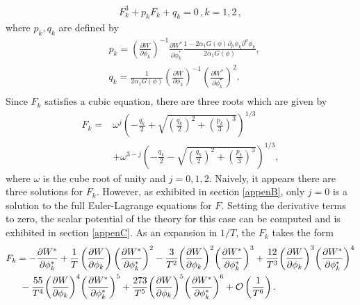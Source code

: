\documentclass[a4paper,11pt]{article}
\begin{document}
  \begin{align}
    F_k^3+ p_k F_k + q_k=0\,, k=1,2\,,
  \end{align}
  where $p_k, q_k$ are defined by
  \begin{equation}\label{DisplayFormulaNumbered:eq.twoDBI.p.1}
  \begin{split}
    & p_k={\left(\frac{\partial W}{\partial \phi_k}\right)}^{-1}\frac{\partial W^*}{\partial \phi^*_k}\frac{1-2\alpha_1 G\left(\phi\right)\partial_\mu \phi_k\partial^\mu \phi_k}{2\alpha_1 G\left(\phi\right)}, \\
    & q_k=\frac{1}{2\alpha_1 G\left(\phi\right)}{\left(\frac{\partial W}{\partial \phi_k}\right)}^{-1}{\left(\frac{\partial W^*}{\partial \phi^*_k}\right)}^2. \\
  \end{split}
  \end{equation}
  Since $F_k$ satisfies a cubic equation, there are three roots which are given by
  \begin{equation}
  \begin{split}
    F_k=& \omega^j {\left(-\frac{q_k}{2}+\sqrt{ {\left(\frac{q_k}{2}\right)}^2+{\left(\frac{p_k}{3}\right)}^3}\right)}^{1/3}\\
    &+ \omega^{3-j}{\left(-\frac{q_k}{2}-\sqrt{ {\left(\frac{q_k}{2}\right)}^2+{\left(\frac{p_k}{3}\right)}^3}\right)}^{1/3},
  \end{split}
  \label{auxsolution}
  \end{equation}
  where $\omega$ is the cube root of unity and $j=0,1,2$.
Naively, it appears there are three solutions for $F_k$. However, as exhibited in section \ref{appenB}, only $j = 0$ is a solution to the full Euler-Lagrange equations for $F$.
  Setting the derivative terms to zero, the scalar potential of the theory for this case can be computed
  and is exhibited in section \ref{appenC}. As an expansion in $1/T$, the $F_k$ takes the form
  \begin{equation}
  \begin{split}
    & F_k=-\frac{\partial W^*}{\partial \phi^*_k}+\frac{1}{T} \left(\frac{\partial W}{\partial \phi_k}\right){\left(\frac{\partial W^*}{\partial \phi^*_k}\right)}^2-\frac{3}{T^2} {\left(\frac{\partial W}{\partial \phi_k}\right)}^2{\left(\frac{\partial W^*}{\partial \phi^*_k}\right)}^3+\frac{12}{T^3}{\left(\frac{\partial W}{\partial \phi_k}\right)}^3{\left(\frac{\partial W^*}{\partial \phi^*_k}\right)}^4 \\
    & \indent{}-\frac{55}{T^4}{\left(\frac{\partial W}{\partial \phi_k}\right)}^4{\left(\frac{\partial W^*}{\partial \phi^*_k}\right)}^5+\frac{273}{T^5}{\left(\frac{\partial W}{\partial \phi_k}\right)}^5{\left(\frac{\partial W^*}{\partial \phi^*_k}\right)}^6+\mathcal{O}\left(\frac{1}{T^6}\right).
  \end{split}
  \label{fexpand}
  \end{equation}
\end{document}
